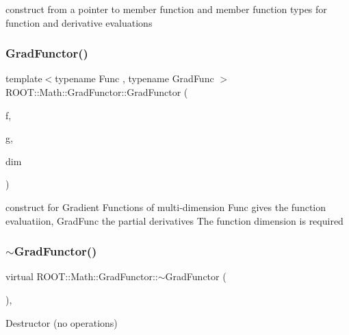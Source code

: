 construct from a pointer to member function and member function types for function and derivative evaluations \mbox{\label{classROOT_1_1Math_1_1GradFunctor_a079a63821986eb0ce6e011c366c1cb9a}} 
\subsubsection{\texorpdfstring{GradFunctor()}{GradFunctor()}\hspace{0.1cm}{\footnotesize\ttfamily [9/15]}}
{\footnotesize\ttfamily template$<$typename Func , typename Grad\+Func $>$ \\
R\+O\+O\+T\+::\+Math\+::\+Grad\+Functor\+::\+Grad\+Functor (\begin{DoxyParamCaption}\item[{const Func \&}]{f,  }\item[{const Grad\+Func \&}]{g,  }\item[{int}]{dim }\end{DoxyParamCaption})\hspace{0.3cm}{\ttfamily [inline]}}

construct for Gradient Functions of multi-\/dimension Func gives the function evaluatiion, Grad\+Func the partial derivatives The function dimension is required \mbox{\label{classROOT_1_1Math_1_1GradFunctor_a1dfc4e8382f679a935eae97c5e7ee4dd}} 
\subsubsection{\texorpdfstring{$\sim$GradFunctor()}{~GradFunctor()}\hspace{0.1cm}{\footnotesize\ttfamily [2/3]}}
{\footnotesize\ttfamily virtual R\+O\+O\+T\+::\+Math\+::\+Grad\+Functor\+::$\sim$\+Grad\+Functor (\begin{DoxyParamCaption}{ }\end{DoxyParamCaption})\hspace{0.3cm}{\ttfamily [inline]}, {\ttfamily [virtual]}}

Destructor (no operations) \mbox{\label{classROOT_1_1Math_1_1GradFunctor_a629b55d9f326dbf39e5c3ccfb4678579}} 

